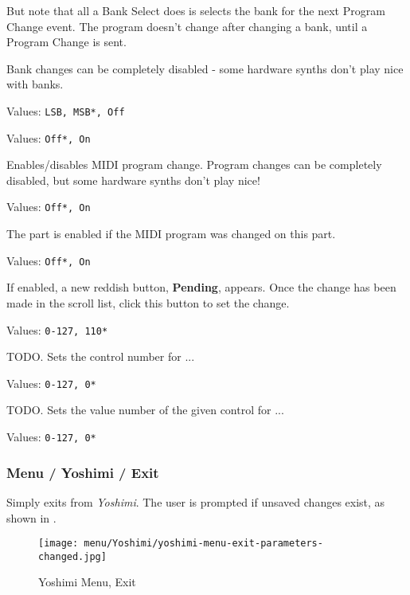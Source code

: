    But note that all a Bank Select does is selects the bank for the next
   Program Change event.  The program doesn't change after changing a bank,
   until a Program Change is sent.

   Bank changes can be completely disabled - some hardware
   synths don't play nice with banks.

   Values: \texttt{LSB, MSB*, Off}


   Values: \texttt{Off*, On}

   Enables/disables MIDI program change.
   Program changes can be completely disabled, but some hardware synths don't
   play nice!


   Values: \texttt{Off*, On}

   The part is enabled if the MIDI program was changed on this part.


   Values: \texttt{Off*, On}

   If enabled, a new reddish button, \textbf{Pending}, appears.
   Once the change has been made in the scroll list, click this button
   to set the change.

   Values: \texttt{0-127, 110*}

   TODO.
   Sets the control number for ...

   Values: \texttt{0-127, 0*}

   TODO.
   Sets the value number of the given control for ...

   Values: \texttt{0-127, 0*}

\subsubsection{Menu / Yoshimi / Exit}
\label{subsubsec:menu_yoshimi_exit}

   Simply exits from \textsl{Yoshimi}.
   The user is prompted if unsaved changes exist, as shown in
   .

\begin{figure}[H]
   \centering 
   \texttt{[image: menu/Yoshimi/yoshimi-menu-exit-parameters-changed.jpg]}
   \caption[Yoshimi Menu, Exit]{Yoshimi Menu, Exit}
   \label{fig:yoshimi_change_exit}
\end{figure}

